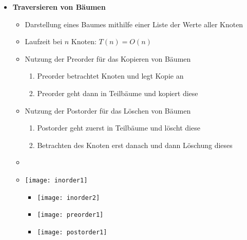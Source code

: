 \begin{itemize}
            \item \textbf{Traversieren von Bäumen}
                \begin{itemize}
                    \item Darstellung eines Baumes mithilfe einer Liste der Werte aller Knoten
                    \item Laufzeit bei $n$ Knoten: $T(n) = O(n)$
                    \item Nutzung der Preorder für das Kopieren von Bäumen 
                        \begin{enumerate}
                            \item Preorder betrachtet Knoten und legt Kopie an
                            \item Preorder geht dann in Teilbäume und kopiert diese
                        \end{enumerate}
                    \item Nutzung der Postorder für das Löschen von Bäumen
                        \begin{enumerate}
                            \item Postorder geht zuerst in Teilbäume und löscht diese 
                            \item Betrachten des Knoten erst danach und dann Löschung dieses
                        \end{enumerate}
                    \item[]
                    \item[]
                        \begin{minipage}[t]{0.4\textwidth}
                            \texttt{[image: inorder1]}           
                        \end{minipage}
                        \begin{minipage}[t]{0.5\textwidth}
                            \vspace{-4.75cm}
                            \begin{itemize}
                                \item[] \texttt{[image: inorder2]}
                                \item[] \texttt{[image: preorder1]}
                                \item[] \texttt{[image: postorder1]}
                            \end{itemize}
                        \end{minipage}

\end{itemize}
\end{itemize}
